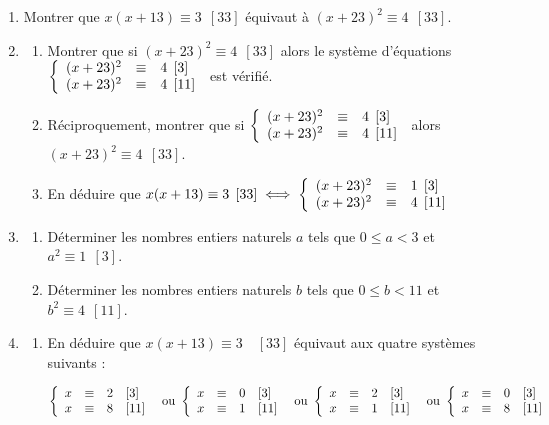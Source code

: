 \documentclass[10pt,a4paper]{article}
\begin{document}
\begin{enumerate}
\item Montrer que $x(x + 13) \equiv 3\:\: [33]$ équivaut à $(x + 23)^2 \equiv 4\:\: [33]$.
\item
	\begin{enumerate}
		\item Montrer que si $(x + 23)^2 \equiv 4\:\: [33]$ alors le système d'équations $\left\{\begin{array}{l c l}
(x + 23)^2 &\equiv &4 \:\: [3]\\ 
(x + 23)^2 &\equiv &4 \:\: [11]
\end{array}\right.$ est vérifié.
		\item Réciproquement, montrer que si  $\left\{\begin{array}{l c l}
(x + 23)^2 &\equiv &4\:\: [3]\\ 
(x + 23)^2 &\equiv &4 \:\: [11]
\end{array}\right.$ alors $(x + 23)^2 \equiv 4\:\: [33]$.
		\item En déduire que $x(x + 13) \equiv 3\:\: [33] \iff  \left\{\begin{array}{l c l}
(x + 23)^2 &\equiv&1 \:\: [3]\\
(x + 23)^2 &\equiv& 4 \:\: [11]
\end{array}\right.$
	\end{enumerate}
\item
	\begin{enumerate}
		\item Déterminer les nombres entiers naturels $a$ tels que $0 \leqslant a < 3$ et $a^2 \equiv 1 \:\:  [3]$.
		\item Déterminer les nombres entiers naturels $b$ tels que $0 \leqslant b < 11$ et $b^2 \equiv 4\:\: [11]$.
 	\end{enumerate}
\item
	\begin{enumerate}
		\item En déduire que $x(x + 13) \equiv 3 \quad[33]$ équivaut aux quatre systèmes suivants :
		
\[\left\{\begin{array}{l c l}
x &\equiv&2\quad [3]\\
x&\equiv &8\quad[11]
\end{array}\right. \: \text{ ou } \left\{\begin{array}{l c l}
 x &\equiv& 0\quad[3]\\
 x &\equiv& 1 \quad[11]
 \end{array}\right.\: \text{ ou } \left\{\begin{array}{l c l}
x  &\equiv& 2\quad[3]\\
x &\equiv&1 \quad[11]
\end{array}\right.\: \text{ ou } \left\{\begin{array}{l c l}
x &\equiv& 0\quad [3]\\
x &\equiv& 8 \quad [11]
\end{array}\right.\]


\end{enumerate}
\end{enumerate}
\end{document}
